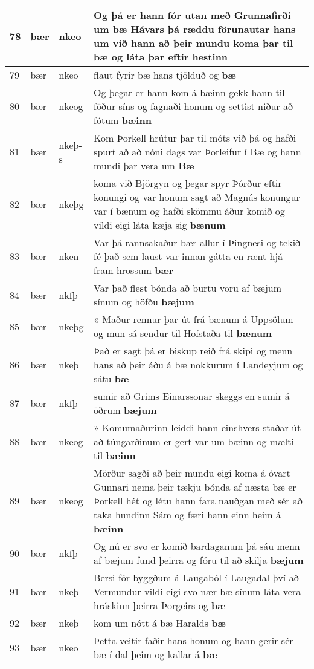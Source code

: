 \documentclass{article}
\begin{document}
\begin{longtable}{p{1cm}|p{1cm}|p{1cm}|p{13cm}}
\hline
78&bær&nkeo&Og þá er hann fór utan með Grunnafirði um bæ Hávars þá ræddu förunautar hans um við hann að þeir mundu koma þar til \textbf{bæ} og láta þar eftir hestinn\\
\hline
79&bær&nkeo&flaut fyrir bæ hans tjölduð og \textbf{bæ} \\
\hline
80&bær&nkeog&Og þegar er hann kom á bæinn gekk hann til föður síns og fagnaði honum og settist niður að fótum \textbf{bæinn} \\
\hline
81&bær&nkeþ-s&Kom Þorkell hrútur þar til móts við þá og hafði spurt að að nóni dags var Þorleifur í Bæ og hann mundi þar vera um \textbf{Bæ} \\
\hline
82&bær&nkeþg&koma við Björgyn og þegar spyr Þórður eftir konungi og var honum sagt að Magnús konungur var í bænum og hafði skömmu áður komið og vildi eigi láta kæja sig \textbf{bænum} \\
\hline
83&bær&nken&Var þá rannsakaður bær allur í Þingnesi og tekið fé það sem laust var innan gátta en rænt hjá fram hrossum \textbf{bær} \\
\hline
84&bær&nkfþ&Var það flest bónda að burtu voru af bæjum sínum og höfðu \textbf{bæjum} \\
\hline
85&bær&nkeþg&« Maður rennur þar út frá bænum á Uppsölum og mun sá sendur til Hofstaða til \textbf{bænum} \\
\hline
86&bær&nkeþ&Það er sagt þá er biskup reið frá skipi og menn hans að þeir áðu á bæ nokkurum í Landeyjum og sátu \textbf{bæ} \\
\hline
87&bær&nkfþ&sumir að Gríms Einarssonar skeggs en sumir á öðrum \textbf{bæjum} \\
\hline
88&bær&nkeog&» Komumaðurinn leiddi hann einshvers staðar út að túngarðinum er gert var um bæinn og mælti til \textbf{bæinn} \\
\hline
89&bær&nkeog&Mörður sagði að þeir mundu eigi koma á óvart Gunnari nema þeir tækju bónda af næsta bæ er Þorkell hét og létu hann fara nauðgan með sér að taka hundinn Sám og færi hann einn heim á \textbf{bæinn} \\
\hline
90&bær&nkfþ&Og nú er svo er komið bardaganum þá sáu menn af bæjum fund þeirra og fóru til að skilja \textbf{bæjum} \\
\hline
91&bær&nkeþ&Bersi fór byggðum á Laugaból í Laugadal því að Vermundur vildi eigi svo nær bæ sínum láta vera hráskinn þeirra Þorgeirs og \textbf{bæ} \\
\hline
92&bær&nkeþ&kom um nótt á bæ Haralds \textbf{bæ} \\
\hline
93&bær&nkeo&Þetta veitir faðir hans honum og hann gerir sér bæ í dal þeim og kallar á \textbf{bæ} \\

\end{longtable}
\end{document}
